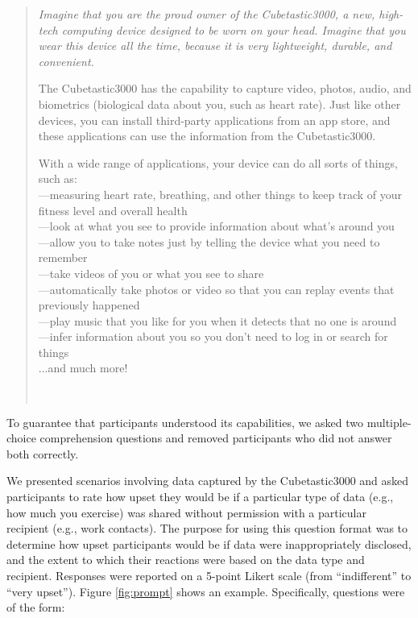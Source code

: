 \documentclass[conference]{IEEEtran}
\begin{document}
\begin{quotation}
{\it Imagine that you are the proud owner of the Cubetastic3000, a new, high-tech computing device designed to be worn on your head. Imagine that you wear this device all the time, because it is very lightweight, durable, and convenient.

The Cubetastic3000 has the capability to capture video, photos, audio, and biometrics (biological data about you, such as heart rate). Just like other devices, you can install third-party applications from an app store, and these applications can use the information from the Cubetastic3000.

With a wide range of applications, your device can do all sorts of things, such as:\\

\noindent---measuring heart rate, breathing, and other things to keep track of your fitness level and overall health\\
\noindent---look at what you see to provide information about what's around you\\
\noindent---allow you to take notes just by telling the device what you need to remember\\
\noindent---take videos of you or what you see to share\\
\noindent---automatically take photos or video so that you can replay events that previously happened\\
\noindent---play music that you like for you when it detects that no one is around\\
\noindent---infer information about you so you don't need to log in or search for things\\
\noindent ...and much more!}\\
\end{quotation}

To guarantee that participants understood its capabilities, we asked two multiple-choice comprehension questions and removed participants who did not answer both correctly.

We presented scenarios involving data captured by the Cubetastic3000 and asked participants to rate how upset they would be if a particular type of data (e.g., how much you exercise) was shared without permission with a particular recipient (e.g., work contacts). The purpose for using this question format was to determine how upset participants would be if data were inappropriately disclosed, and the extent to which their reactions were based on the data type and recipient. Responses were reported on a 5-point Likert scale (from ``indifferent'' to ``very upset''). Figure \ref{fig:prompt} shows an example.  Specifically, questions were of the form: 
\end{document}
